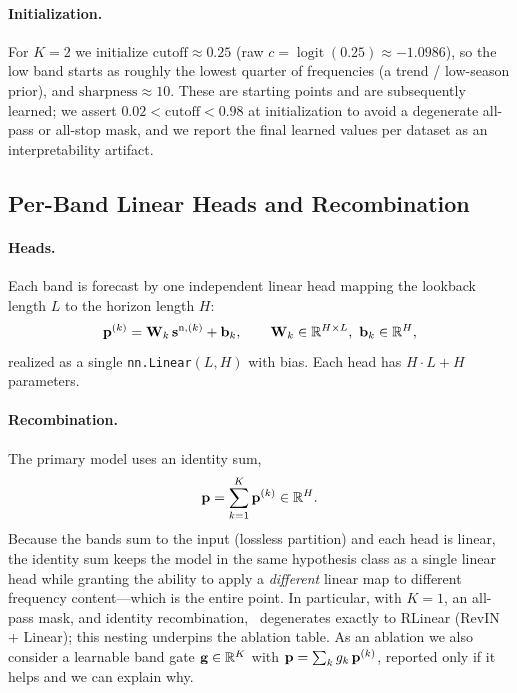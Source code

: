 \paragraph{Initialization.}
For $K{=}2$ we initialize $\mathrm{cutoff}\approx 0.25$
(raw $c = \operatorname{logit}(0.25) \approx -1.0986$), so the low band starts as
roughly the lowest quarter of frequencies (a trend / low-season prior), and
$\mathrm{sharpness}\approx 10$. These are starting points and are subsequently
learned; we assert $0.02 < \mathrm{cutoff} < 0.98$ at initialization to avoid a
degenerate all-pass or all-stop mask, and we report the final learned values per
dataset as an interpretability artifact.

\subsection{Per-Band Linear Heads and Recombination}
\label{sec:method:heads}

\paragraph{Heads.}
Each band is forecast by one independent linear head mapping the lookback length
$L$ to the horizon length $H$:
\begin{equation}
\mathbf{p}^{(k)} = \mathbf{W}_k\, \mathbf{s}^{\mathrm{n},(k)} + \mathbf{b}_k,
\qquad \mathbf{W}_k \in \mathbb{R}^{H \times L},\ \mathbf{b}_k \in \mathbb{R}^{H},
\label{eq:head}
\end{equation}
realized as a single \texttt{nn.Linear}$(L,H)$ with bias. Each head has
$H{\cdot}L + H$ parameters.

\paragraph{Recombination.}
The primary model uses an identity sum,
\begin{equation}
\mathbf{p} = \sum_{k=1}^{K} \mathbf{p}^{(k)} \in \mathbb{R}^{H}.
\label{eq:recomb}
\end{equation}
Because the bands sum to the input (lossless partition) and each head is linear,
the identity sum keeps the model in the same hypothesis class as a single linear
head while granting the ability to apply a \emph{different} linear map to
different frequency content---which is the entire point. In particular, with
$K{=}1$, an all-pass mask, and identity recombination, \method\ degenerates
exactly to RLinear (RevIN + Linear); this nesting underpins the ablation table.
As an ablation we also consider a learnable band gate $\mathbf{g}\in\mathbb{R}^{K}$ with
$\mathbf{p} = \sum_k g_k\,\mathbf{p}^{(k)}$, reported only if it helps and we can explain why.


